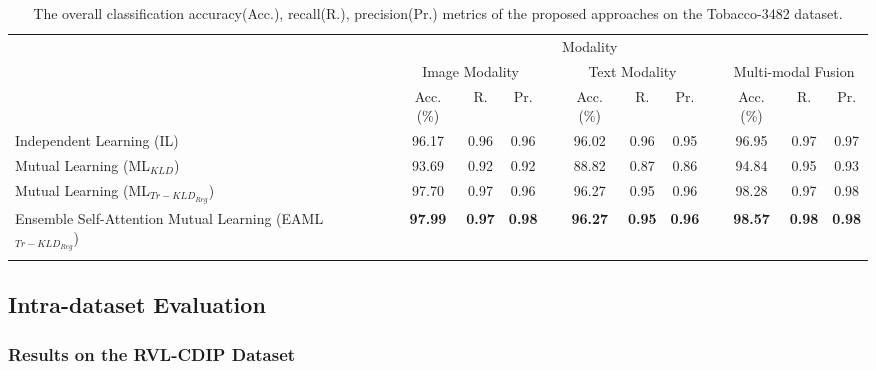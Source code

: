 \documentclass[twocolumn]{svjour3}
\begin{document}
\setlength\tabcolsep{3 pt}
\begin{table*}[tbh]
\small
\centering
\caption{The overall classification accuracy(Acc.), recall(R.), precision(Pr.) metrics of the proposed approaches on the Tobacco-3482 dataset.}
\resizebox{\textwidth}{!} {\begin{tabular}{lcccccccccccc}
    \hline\noalign{\smallskip}
     \multicolumn{1}{c}{} && \multicolumn{9}{c}{Modality} \\
         \noalign{\smallskip}\hline\noalign{\smallskip}
         \multicolumn{1}{c}{Method} && \multicolumn{3}{c}{Image Modality} && \multicolumn{3}{c}{Text Modality} && \multicolumn{3}{c}{Multi-modal Fusion} \\
         \noalign{\smallskip}\hline\noalign{\smallskip}
          && Acc.(\%) & R. & Pr. && Acc.(\%) & R. & Pr. && Acc.(\%) & R. & Pr.\\
         \cmidrule{3-5}\cmidrule{7-9}\cmidrule{11-13}
         Independent Learning (IL) && 96.17 & 0.96 & 0.96 && 96.02 & 0.96 & 0.95 && 96.95 & 0.97 & 0.97 \\
         Mutual Learning (ML$_{KLD}$) && 93.69 & 0.92 & 0.92 && 88.82 & 0.87 & 0.86 && 94.84 & 0.95 & 0.93 \\
         Mutual Learning (ML$_{{Tr-KLD}_{Reg}}$) && 97.70 & 0.97 & 0.96 && 96.27 & 0.95 & 0.96 && 98.28 & 0.97 & 0.98\\
         Ensemble Self-Attention Mutual Learning (EAML$_{{Tr-KLD}_{Reg}}$) && \textbf{97.99} & \textbf{0.97} & \textbf{0.98} && \textbf{96.27} & \textbf{0.95} & \textbf{0.96} && \textbf{98.57} & \textbf{0.98} & \textbf{0.98} \\
    \noalign{\smallskip}\hline
    \end{tabular}}
    \label{tab:ResultsonTobacco}
\end{table*}

\subsection{Intra-dataset Evaluation}

\subsubsection{Results on the RVL-CDIP Dataset}
\end{document}
